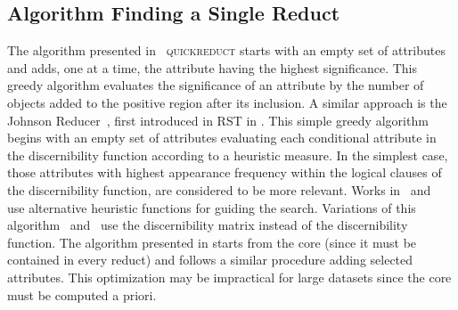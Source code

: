 \documentclass[authoryear,11pt]{elsarticle}
\makeatletter
\newcommand{\setword}[2]{%
  \phantomsection
  #1\def\@currentlabel{\unexpanded{#1}}\label{#2}%
}
\makeatother
\begin{document}
 
\subsection{Algorithm Finding a Single Reduct}
  The algorithm presented in~\citep{Chouchoulas01} \setword{\textsc{quickreduct}}{quickreduct} starts with 
  an empty set of attributes and adds, one at a time, the attribute having the highest significance. 
  This greedy algorithm evaluates the significance of an attribute by the number of objects added to 
  the positive region after its inclusion.  
  A similar approach is the Johnson Reducer~\citep{Johnson74}, first introduced in RST in \citep{Ohrn00}.
  This simple greedy algorithm begins with an empty set of attributes evaluating each conditional attribute in the
  discernibility function according to a heuristic measure. In the simplest case, those attributes with highest 
  appearance frequency within the logical clauses of the discernibility function, are considered to be more
  relevant. Works in~\citep{Nguyen97} and~\citep{Wang01} use alternative heuristic functions for guiding the
  search. 
  Variations of this algorithm~\citep{Wang01} and~\citep{Yang08} use the discernibility matrix instead of the
  discernibility function.
  The algorithm presented in \citep{Zhong01} starts from the core (since it must be contained in every reduct) and
  follows a similar procedure adding selected attributes. This optimization may be impractical for large datasets
  \citep{Jensen14} since the core must be computed a priori.
  
\end{document}
